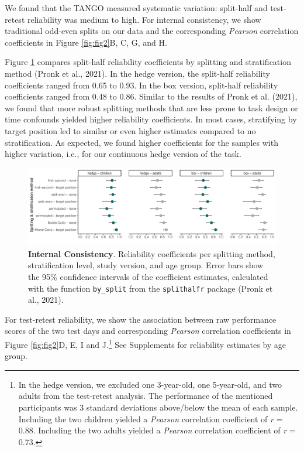 \documentclass[
  man,floatsintext]{apa7}
\begin{document}
We found that the TANGO measured systematic variation: split-half and test-retest reliability was medium to high.
For internal consistency, we show traditional odd-even splits on our data and the corresponding \emph{Pearson} correlation coefficients in Figure \ref{fig:fig2}B, C, G, and H.

Figure \ref{fig:fig3} compares split-half reliability coefficients by splitting and stratification method (Pronk et al., 2021).
In the hedge version, the split-half reliability coefficients ranged from 0.65 to 0.93.
In the box version, split-half reliability coefficients ranged from 0.48 to 0.86.
Similar to the results of Pronk et al. (2021), we found that more robust splitting methods that are less prone to task design or time confounds yielded higher reliability coefficients.
In most cases, stratifying by target position led to similar or even higher estimates compared to no stratification.
As expected, we found higher coefficients for the samples with higher variation, i.e., for our continuous hedge version of the task.



\begin{figure}

{\centering \includegraphics[width=1\linewidth]{../figures/tango_splithalf} 

}

\caption{\textbf{Internal Consistency}. Reliability coefficients per splitting method, stratification level, study version, and age group. Error bars show the 95\% confidence intervals of the coefficient estimates, calculated with the function \texttt{by\_split} from the \texttt{splithalfr} package (Pronk et al., 2021).}\label{fig:fig3}
\end{figure}

For test-retest reliability, we show the association between raw performance scores of the two test days and corresponding \emph{Pearson} correlation coefficients in Figure \ref{fig:fig2}D, E, I and J.\footnote{In the hedge version, we excluded one 3-year-old, one 5-year-old, and two adults from the test-retest analysis.
  The performance of the mentioned participants was 3 standard deviations above/below the mean of each sample.
  Including the two children yielded a \emph{Pearson} correlation coefficient of \emph{r} = 0.88.
  Including the two adults yielded a \emph{Pearson} correlation coefficient of \emph{r} = 0.73.}
See Supplements for reliability estimates by age group.
\end{document}
